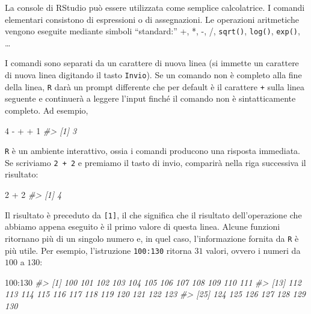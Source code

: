 \documentclass[
  11pt,
]{krantz}
\makeatletter
\newenvironment{Shaded}{\begin{snugshade}}{\end{snugshade}}
\newcommand{\CommentTok}[1]{\textcolor[rgb]{0.37,0.37,0.37}{\textit{#1}}}
\newcommand{\DecValTok}[1]{\textcolor[rgb]{0.06,0.06,0.06}{#1}}
\newcommand{\SpecialCharTok}[1]{\textcolor[rgb]{0,0,0}{#1}}
\newenvironment{kframe}{%
\medskip{}
\setlength{\fboxsep}{.8em}
 \def\at@end@of@kframe{}%
 \ifinner\ifhmode%
  \def\at@end@of@kframe{\end{minipage}}%
  \begin{minipage}{\columnwidth}%
 \fi\fi%
 \def\FrameCommand##1{\hskip\@totalleftmargin \hskip-\fboxsep
 \colorbox{shadecolor}{##1}\hskip-\fboxsep
     \hskip-\linewidth \hskip-\@totalleftmargin \hskip\columnwidth}%
 \MakeFramed {\advance\hsize-\width
   \@totalleftmargin\z@ \linewidth\hsize
   \@setminipage}}%
 {\par\unskip\endMakeFramed%
 \at@end@of@kframe}
\renewenvironment{Shaded}{\begin{kframe}}{\end{kframe}}
\theoremstyle{definition}
\theoremstyle{definition}
\theoremstyle{definition}
\theoremstyle{definition}
\theoremstyle{remark}
\makeatother
\begin{document}
La console di RStudio può essere utilizzata come semplice calcolatrice. I comandi elementari consistono di espressioni o di assegnazioni. Le operazioni aritmetiche vengono eseguite mediante simboli ``standard:'' +, *, -, /, \texttt{sqrt()}, \texttt{log()}, \texttt{exp()}, \ldots{}

I comandi sono separati da un carattere di nuova linea (si immette un carattere di nuova linea digitando il tasto \texttt{Invio}). Se un comando non è completo alla fine della linea, \texttt{R} darà un prompt differente che per default è il carattere \texttt{+} sulla linea seguente e continuerà a leggere l'input finché il comando non è sintatticamente completo. Ad esempio,

\begin{Shaded}
\begin{Highlighting}[]
\DecValTok{4} \SpecialCharTok{{-}}
\SpecialCharTok{+} 
\SpecialCharTok{+} \DecValTok{1}
\CommentTok{\#\textgreater{} [1] 3}
\end{Highlighting}
\end{Shaded}

\texttt{R} è un ambiente interattivo, ossia i comandi producono una risposta immediata. Se scriviamo \texttt{2\ +\ 2} e premiamo il tasto di invio, comparirà nella riga successiva il risultato:

\begin{Shaded}
\begin{Highlighting}[]
\DecValTok{2} \SpecialCharTok{+} \DecValTok{2}
\CommentTok{\#\textgreater{} [1] 4}
\end{Highlighting}
\end{Shaded}

Il risultato è preceduto da \texttt{{[}1{]}}, il che significa che il risultato dell'operazione che abbiamo appena eseguito è il primo valore di questa linea. Alcune funzioni ritornano più di un singolo numero e, in quel caso, l'informazione fornita da \texttt{R} è più utile. Per esempio, l'istruzione \texttt{100:130} ritorna \(31\) valori, ovvero i numeri da \(100\) a \(130\):

\begin{Shaded}
\begin{Highlighting}[]
\DecValTok{100}\SpecialCharTok{:}\DecValTok{130}
\CommentTok{\#\textgreater{}  [1] 100 101 102 103 104 105 106 107 108 109 110 111}
\CommentTok{\#\textgreater{} [13] 112 113 114 115 116 117 118 119 120 121 122 123}
\CommentTok{\#\textgreater{} [25] 124 125 126 127 128 129 130}
\end{Highlighting}
\end{Shaded}
\end{document}
